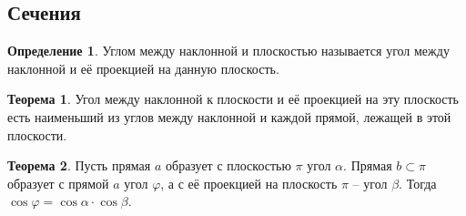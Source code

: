 \documentclass[12pt]{article}
\theoremstyle{definition}
\newtheorem{theorem}{Теорема}[section]
\newtheorem{definition}{Определение}
\begin{document}
\subsection{Сечения}


\begin{definition}
    Углом между наклонной и плоскостью называется угол между наклонной и её проекцией на данную плоскость. 
\end{definition}
\begin{theorem}
    Угол между наклонной к плоскости и её проекцией на эту плоскость есть наименьший из углов между наклонной и каждой прямой, лежащей в этой плоскости.
\end{theorem}
\begin{theorem}
    Пусть прямая $a$ образует с плоскостью $\pi$ угол $\alpha$. Прямая $b\subset\pi$ образует с прямой $a$ угол $\varphi$, а с её проекцией на плоскость $\pi$ – угол $\beta$. Тогда $\cos\varphi=\cos\alpha\cdot\cos\beta$.
\end{theorem}
\end{document}
